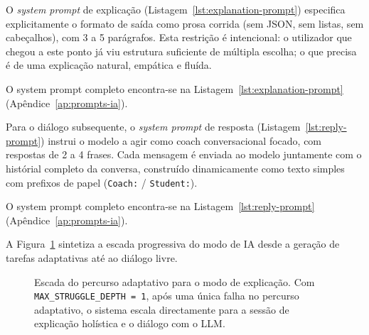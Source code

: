 O \emph{system prompt} de explica\c{c}\~ao (Listagem~\ref{lst:explanation-prompt})
especifica explicitamente o formato de sa\'ida como prosa corrida (sem JSON,
sem listas, sem cabe\c{c}alhos), com 3 a 5 par\'agrafos. Esta restri\c{c}\~ao
\'e intencional: o utilizador que chegou a este ponto j\'a viu estrutura
suficiente de m\'ultipla escolha; o que precisa \'e de uma explica\c{c}\~ao
natural, emp\'atica e flu\'ida.

O system prompt completo encontra-se na Listagem~\ref{lst:explanation-prompt}
(Ap\^endice~\ref{ap:prompts-ia}).

Para o di\'alogo subsequente, o \emph{system prompt} de resposta
(Listagem~\ref{lst:reply-prompt}) instrui o modelo a agir como coach
conversacional focado, com respostas de 2 a 4 frases. Cada mensagem \'e
enviada ao modelo juntamente com o hist\'orial completo da conversa,
constru\'ido dinamicamente como texto simples com prefixos de papel
(\texttt{Coach:} / \texttt{Student:}).

O system prompt completo encontra-se na Listagem~\ref{lst:reply-prompt}
(Ap\^endice~\ref{ap:prompts-ia}).

A Figura~\ref{fig:escalada-ia} sintetiza a escada progressiva do modo de IA
desde a gera\c{c}\~ao de tarefas adaptativas at\'e ao di\'alogo livre.

\begin{figure}[H]
	\centering
	\caption[Escada progressiva para o modo de explica\c{c}\~ao]{Escada do percurso adaptativo para o modo de explica\c{c}\~ao. Com \texttt{MAX\_STRUGGLE\_DEPTH = 1}, ap\'os uma \'unica falha no percurso adaptativo, o sistema escala directamente para a sess\~ao de explica\c{c}\~ao hol\'istica e o di\'alogo com o LLM.}
	\label{fig:escalada-ia}
\end{figure}

